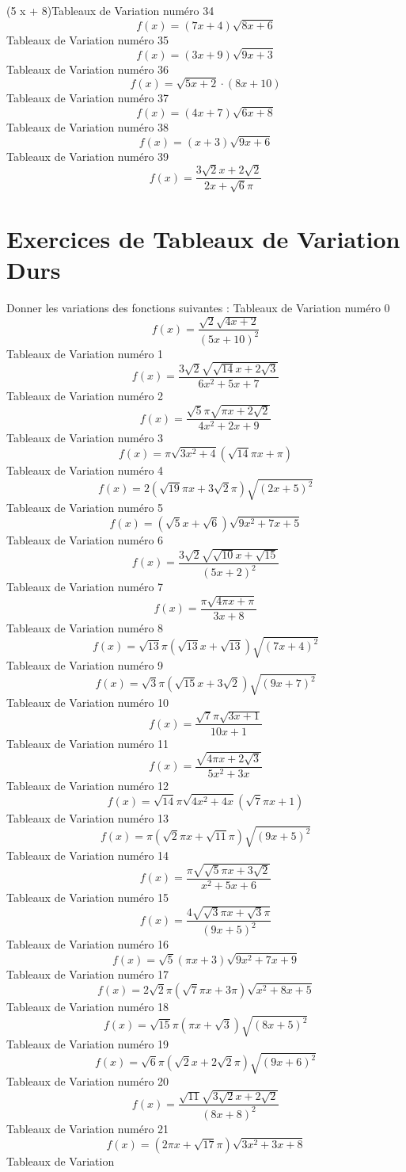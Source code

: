\documentclass{article}
\begin{document}
 \cdot \left(5 x + 8\right)\]Tableaux de Variation num\'ero 34 \[f(x) = \left(7 x + 4\right) \sqrt{8 x + 6}\]Tableaux de Variation num\'ero 35 \[f(x) = \left(3 x + 9\right) \sqrt{9 x + 3}\]Tableaux de Variation num\'ero 36 \[f(x) = \sqrt{5 x + 2} \cdot \left(8 x + 10\right)\]Tableaux de Variation num\'ero 37 \[f(x) = \left(4 x + 7\right) \sqrt{6 x + 8}\]Tableaux de Variation num\'ero 38 \[f(x) = \left(x + 3\right) \sqrt{9 x + 6}\]Tableaux de Variation num\'ero 39 \[f(x) = \frac{3 \sqrt{2} x + 2 \sqrt{2}}{2 x + \sqrt{6} \pi}\]
 \section{Exercices de Tableaux de Variation Durs}

 Donner les variations des fonctions suivantes : 
Tableaux de Variation num\'ero 0 \[f(x) = \frac{\sqrt{2} \sqrt{4 x + 2}}{\left(5 x + 10\right)^{2}}\]Tableaux de Variation num\'ero 1 \[f(x) = \frac{3 \sqrt{2} \sqrt{\sqrt{14} x + 2 \sqrt{3}}}{6 x^{2} + 5 x + 7}\]Tableaux de Variation num\'ero 2 \[f(x) = \frac{\sqrt{5} \pi \sqrt{\pi x + 2 \sqrt{2}}}{4 x^{2} + 2 x + 9}\]Tableaux de Variation num\'ero 3 \[f(x) = \pi \sqrt{3 x^{2} + 4} \left(\sqrt{14} \pi x + \pi\right)\]Tableaux de Variation num\'ero 4 \[f(x) = 2 \left(\sqrt{19} \pi x + 3 \sqrt{2} \pi\right) \sqrt{\left(2 x + 5\right)^{2}}\]Tableaux de Variation num\'ero 5 \[f(x) = \left(\sqrt{5} x + \sqrt{6}\right) \sqrt{9 x^{2} + 7 x + 5}\]Tableaux de Variation num\'ero 6 \[f(x) = \frac{3 \sqrt{2} \sqrt{\sqrt{10} x + \sqrt{15}}}{\left(5 x + 2\right)^{2}}\]Tableaux de Variation num\'ero 7 \[f(x) = \frac{\pi \sqrt{4 \pi x + \pi}}{3 x + 8}\]Tableaux de Variation num\'ero 8 \[f(x) = \sqrt{13} \pi \left(\sqrt{13} x + \sqrt{13}\right) \sqrt{\left(7 x + 4\right)^{2}}\]Tableaux de Variation num\'ero 9 \[f(x) = \sqrt{3} \pi \left(\sqrt{15} x + 3 \sqrt{2}\right) \sqrt{\left(9 x + 7\right)^{2}}\]Tableaux de Variation num\'ero 10 \[f(x) = \frac{\sqrt{7} \pi \sqrt{3 x + 1}}{10 x + 1}\]Tableaux de Variation num\'ero 11 \[f(x) = \frac{\sqrt{4 \pi x + 2 \sqrt{3}}}{5 x^{2} + 3 x}\]Tableaux de Variation num\'ero 12 \[f(x) = \sqrt{14} \pi \sqrt{4 x^{2} + 4 x} \left(\sqrt{7} \pi x + 1\right)\]Tableaux de Variation num\'ero 13 \[f(x) = \pi \left(\sqrt{2} \pi x + \sqrt{11} \pi\right) \sqrt{\left(9 x + 5\right)^{2}}\]Tableaux de Variation num\'ero 14 \[f(x) = \frac{\pi \sqrt{\sqrt{5} \pi x + 3 \sqrt{2}}}{x^{2} + 5 x + 6}\]Tableaux de Variation num\'ero 15 \[f(x) = \frac{4 \sqrt{\sqrt{3} \pi x + \sqrt{3} \pi}}{\left(9 x + 5\right)^{2}}\]Tableaux de Variation num\'ero 16 \[f(x) = \sqrt{5} \left(\pi x + 3\right) \sqrt{9 x^{2} + 7 x + 9}\]Tableaux de Variation num\'ero 17 \[f(x) = 2 \sqrt{2} \pi \left(\sqrt{7} \pi x + 3 \pi\right) \sqrt{x^{2} + 8 x + 5}\]Tableaux de Variation num\'ero 18 \[f(x) = \sqrt{15} \pi \left(\pi x + \sqrt{3}\right) \sqrt{\left(8 x + 5\right)^{2}}\]Tableaux de Variation num\'ero 19 \[f(x) = \sqrt{6} \pi \left(\sqrt{2} x + 2 \sqrt{2} \pi\right) \sqrt{\left(9 x + 6\right)^{2}}\]Tableaux de Variation num\'ero 20 \[f(x) = \frac{\sqrt{11} \sqrt{3 \sqrt{2} x + 2 \sqrt{2}}}{\left(8 x + 8\right)^{2}}\]Tableaux de Variation num\'ero 21 \[f(x) = \left(2 \pi x + \sqrt{17} \pi\right) \sqrt{3 x^{2} + 3 x + 8}\]Tableaux de Variation 
\end{document}
